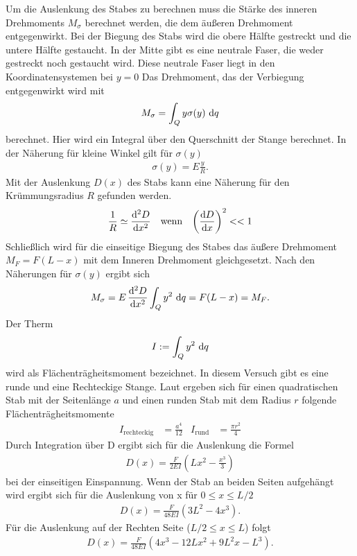 Um die Auslenkung des Stabes zu berechnen muss die Stärke des inneren Drehmoments $M_\sigma$ berechnet werden, 
die dem äußeren Drehmoment entgegenwirkt.
Bei der Biegung des Stabs wird die obere Hälfte gestreckt und die untere Hälfte gestaucht.
In der Mitte gibt es eine neutrale Faser, die weder gestreckt noch gestaucht wird.
Diese neutrale Faser liegt in den Koordinatensystemen bei $y = 0$ 
Das Drehmoment, das der Verbiegung entgegenwirkt wird mit 
\begin{align}
    M_\sigma = \int_{Q}^{} y \sigma(y) \,\mathop{}\!\mathrm{d} q 
    \label{eq:inneres_Moment_int}
\end{align}
berechnet.
Hier wird ein Integral über den Querschnitt der Stange berechnet.
In der Näherung für kleine Winkel gilt für $\sigma(y)$
\begin{align*}
    \sigma(y) = E \frac{y}{R} .
\end{align*}
Mit der Auslenkung $D(x)$ des Stabs kann eine Näherung für den Krümmungsradius $R$ gefunden werden.
\begin{align*}
    \frac{1}{R} &\simeq  \frac{\mathop{}\!\mathrm{d}^2 D}{\mathop{}\!\mathrm{d} x^2} & &\text{wenn} & \left(\frac{\mathop{}\!\mathrm{d} D}{\mathop{}\!\mathrm{d} x}\right)^2 << 1 
\end{align*}
Schließlich wird für die einseitige Biegung des Stabes das äußere Drehmoment $M_F = F(L - x)$ mit dem Inneren Drehmoment gleichgesetzt.
Nach den Näherungen für $\sigma(y)$ ergibt sich
\begin{align}
    M_\sigma = E \, \frac{\diff^2 D}{\diff x^2} \int_{Q} y^2 \,\diff q = F (L - x) = M_F  . %
    \label{eq:Momentengleichung_einseitig}
\end{align}
Der Therm 
\begin{align}
    I := \int_{Q} y^2 \,\mathop{}\!\mathrm{d} q
\end{align} 
wird als Flächenträgheitsmoment bezeichnet.
In diesem Versuch gibt es eine runde und eine Rechteckige Stange.
Laut \cite{uni_siegen} ergeben sich für einen quadratischen Stab mit der Seitenlänge $a$ und einen runden Stab mit dem Radius $r$ folgende Flächenträgheitsmomente
\begin{align}
    I_\text{rechteckig} &= \frac{a^4}{12} & I_\text{rund} &= \frac{\pi r^2}{4}
    \label{eq:Flachentragheitsmomente}
\end{align}
%
Durch Integration über D ergibt sich für die Auslenkung die Formel
\begin{align}
    D(x) = \frac{F}{2 E I} \left(L x^2 - \frac{x^3}{3} \right)
    \label{eq:D_x_einseitig}
\end{align}
bei der einseitigen Einspannung.
Wenn der Stab an beiden Seiten aufgehängt wird ergibt sich für die Auslenkung von x für
$0 \leq x \leq L/2$
\begin{align}
    D(x) = \frac{F}{48 E I} \left(3 L^2- 4 x^3\right).
    \label{D_x_links}
\end{align}
Für die Auslenkung auf der Rechten Seite ($L/2 \leq x \leq L $) folgt
\begin{align}
    D(x) = \frac{F}{48 E I} \left(4x^3 - 12L x^2 + 9L^2 x - L^3 \right). 
    \label{D_x_rechts}
\end{align}